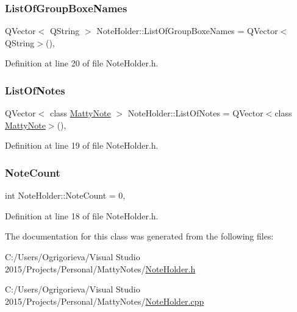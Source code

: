 \subsubsection{\texorpdfstring{List\+Of\+Group\+Boxe\+Names}{ListOfGroupBoxeNames}}
{\footnotesize\ttfamily Q\+Vector$<$ Q\+String $>$ Note\+Holder\+::\+List\+Of\+Group\+Boxe\+Names = Q\+Vector$<$Q\+String$>$()\hspace{0.3cm}{\ttfamily [static]}, {\ttfamily [private]}}



Definition at line 20 of file Note\+Holder.\+h.

\hypertarget{classNoteHolder_a00b2d3ea1a95febaf0d8a5526b786e95}{}\label{classNoteHolder_a00b2d3ea1a95febaf0d8a5526b786e95} 
\subsubsection{\texorpdfstring{List\+Of\+Notes}{ListOfNotes}}
{\footnotesize\ttfamily Q\+Vector$<$ class \hyperlink{classMattyNote}{Matty\+Note} $>$ Note\+Holder\+::\+List\+Of\+Notes = Q\+Vector$<$class \hyperlink{classMattyNote}{Matty\+Note}$>$()\hspace{0.3cm}{\ttfamily [static]}, {\ttfamily [private]}}



Definition at line 19 of file Note\+Holder.\+h.

\hypertarget{classNoteHolder_a7fd3dd17b879e12cef0b0466ef04ed37}{}\label{classNoteHolder_a7fd3dd17b879e12cef0b0466ef04ed37} 
\subsubsection{\texorpdfstring{Note\+Count}{NoteCount}}
{\footnotesize\ttfamily int Note\+Holder\+::\+Note\+Count = 0\hspace{0.3cm}{\ttfamily [static]}, {\ttfamily [private]}}



Definition at line 18 of file Note\+Holder.\+h.



The documentation for this class was generated from the following files\+:\begin{DoxyCompactItemize}
\item 
C\+:/\+Users/\+Ogrigorieva/\+Visual Studio 2015/\+Projects/\+Personal/\+Matty\+Notes/\hyperlink{NoteHolder_8h}{Note\+Holder.\+h}\item 
C\+:/\+Users/\+Ogrigorieva/\+Visual Studio 2015/\+Projects/\+Personal/\+Matty\+Notes/\hyperlink{NoteHolder_8cpp}{Note\+Holder.\+cpp}\end{DoxyCompactItemize}
